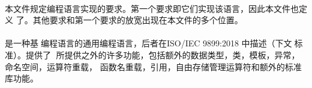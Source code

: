 \paragraph{} %
本文件规定\cpp{}编程语言实现的要求。第一个要求即它们实现该语言，因此本文件也定义
了\cpp{}。其他要求和第一个要求的放宽出现在本文件的多个位置。

\paragraph{} %
\cpp{}是一种基于\c{}编程语言的通用编程语言，后者在ISO/IEC 9899:2018
中描述（下文称\c{}标准）。\cpp{}提供了除\c{}
所提供之外的许多功能，包括额外的数据类型，类，模板，异常，命名空间，运算符重载，
函数名重载，引用，自由存储管理运算符和额外的标准库功能。
